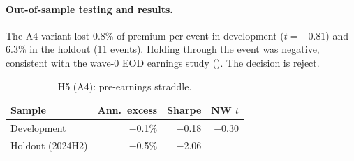 \documentclass[../main.tex]{subfiles}
\begin{document}
\paragraph{Out-of-sample testing and results.}
The A4 variant lost 0.8\% of premium per event in development ($t = -0.81$) and 6.3\% in the holdout (11 events). Holding through the event was negative, consistent with the wave-0 EOD earnings study (). The decision is reject.

\begin{table}[tbp]
\centering\small
\caption{H5 (A4): pre-earnings straddle.}\label{tab:h5}
\begin{tabular}{@{}lrrr@{}}
\toprule
Sample & Ann.\ excess & Sharpe & NW $t$ \\
\midrule
Development & $-$0.1\% & $-$0.18 & $-$0.30 \\
Holdout (2024H2) & $-$0.5\% & $-$2.06 & \\
\bottomrule
\end{tabular}
\end{table}

\end{document}
